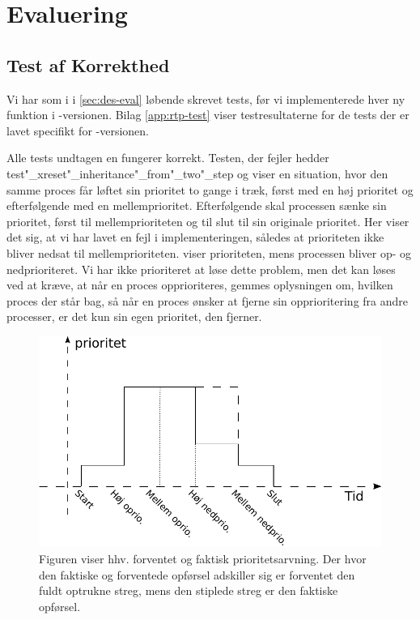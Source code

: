 \section{Evaluering}
\subsection{Test af Korrekthed}
Vi har som i \des i \cref{sec:des-eval} løbende skrevet tests, før vi implementerede hver ny funktion i -versionen.  Bilag \ref{app:rtp-test} viser testresultaterne for de tests der er lavet specifikt for -versionen.

 Alle tests undtagen en fungerer korrekt. Testen, der fejler hedder test"_xreset"_inheritance"_from"_two"_step og viser en situation, hvor den samme proces får løftet sin prioritet to gange i træk, først med en høj prioritet og efterfølgende med en mellemprioritet. Efterfølgende skal processen sænke sin prioritet, først til  mellemprioriteten og til slut til sin originale prioritet. Her viser det sig, at vi har lavet en fejl i implementeringen, således at prioriteten ikke bliver nedsat til mellemprioriteten.  viser prioriteten, mens processen bliver op- og nedprioriteret. Vi har ikke prioriteret at løse dette problem, men det kan løses ved at kræve, at når en proces opprioriteres, gemmes oplysningen om, hvilken proces der står bag, så når en proces ønsker at fjerne sin opprioritering fra andre processer, er det kun sin egen  prioritet, den fjerner.  
 
  
\begin{figure}
 \begin{center}
  \includegraphics[scale=1]{images/priority-inheritance}
	\caption{Figuren viser hhv. forventet og faktisk prioritetsarvning. Der hvor den faktiske og forventede opførsel adskiller sig er forventet den fuldt optrukne streg, mens den stiplede streg er den faktiske opførsel.}
	\label{fig:priority-inheritance}
\end{center}
\end{figure}
  

